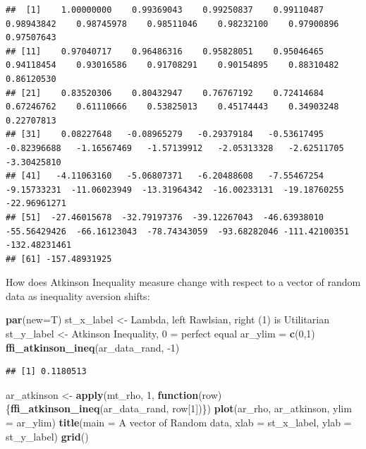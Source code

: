 \documentclass[
]{book}
\newenvironment{Shaded}{\begin{snugshade}}{\end{snugshade}}
\newcommand{\ControlFlowTok}[1]{\textcolor[rgb]{0.13,0.29,0.53}{\textbf{#1}}}
\newcommand{\DataTypeTok}[1]{\textcolor[rgb]{0.13,0.29,0.53}{#1}}
\newcommand{\DecValTok}[1]{\textcolor[rgb]{0.00,0.00,0.81}{#1}}
\newcommand{\KeywordTok}[1]{\textcolor[rgb]{0.13,0.29,0.53}{\textbf{#1}}}
\newcommand{\NormalTok}[1]{#1}
\newcommand{\StringTok}[1]{\textcolor[rgb]{0.31,0.60,0.02}{#1}}
\begin{document}
\begin{verbatim}
##  [1]    1.00000000    0.99369043    0.99250837    0.99110487    0.98943842    0.98745978    0.98511046    0.98232100    0.97900896    0.97507643
## [11]    0.97040717    0.96486316    0.95828051    0.95046465    0.94118454    0.93016586    0.91708291    0.90154895    0.88310482    0.86120530
## [21]    0.83520306    0.80432947    0.76767192    0.72414684    0.67246762    0.61110666    0.53825013    0.45174443    0.34903248    0.22707813
## [31]    0.08227648   -0.08965279   -0.29379184   -0.53617495   -0.82396688   -1.16567469   -1.57139912   -2.05313328   -2.62511705   -3.30425810
## [41]   -4.11063160   -5.06807371   -6.20488608   -7.55467254   -9.15733231  -11.06023949  -13.31964342  -16.00233131  -19.18760255  -22.96961271
## [51]  -27.46015678  -32.79197376  -39.12267043  -46.63938010  -55.56429426  -66.16123043  -78.74343059  -93.68282046 -111.42100351 -132.48231461
## [61] -157.48931925
\end{verbatim}

How does Atkinson Inequality measure change with respect to a vector of random data as inequality aversion shifts:

\begin{Shaded}
\begin{Highlighting}[]
\KeywordTok{par}\NormalTok{(}\DataTypeTok{new=}\NormalTok{T)}
\NormalTok{st\_x\_label \textless{}{-}}\StringTok{ \textquotesingle{}Lambda, left Rawlsian, right (1) is Utilitarian\textquotesingle{}}
\NormalTok{st\_y\_label \textless{}{-}}\StringTok{ \textquotesingle{}Atkinson Inequality, 0 = perfect equal\textquotesingle{}}
\NormalTok{ar\_ylim =}\StringTok{ }\KeywordTok{c}\NormalTok{(}\DecValTok{0}\NormalTok{,}\DecValTok{1}\NormalTok{)}
\KeywordTok{ffi\_atkinson\_ineq}\NormalTok{(ar\_data\_rand, }\DecValTok{{-}1}\NormalTok{)}
\end{Highlighting}
\end{Shaded}

\begin{verbatim}
## [1] 0.1180513
\end{verbatim}

\begin{Shaded}
\begin{Highlighting}[]
\NormalTok{ar\_atkinson \textless{}{-}}\StringTok{ }\KeywordTok{apply}\NormalTok{(mt\_rho, }\DecValTok{1}\NormalTok{, }\ControlFlowTok{function}\NormalTok{(row)\{}\KeywordTok{ffi\_atkinson\_ineq}\NormalTok{(ar\_data\_rand, row[}\DecValTok{1}\NormalTok{])\})}
\KeywordTok{plot}\NormalTok{(ar\_rho, ar\_atkinson, }\DataTypeTok{ylim =}\NormalTok{ ar\_ylim)}
\KeywordTok{title}\NormalTok{(}\DataTypeTok{main =} \StringTok{\textquotesingle{}A vector of Random data\textquotesingle{}}\NormalTok{, }\DataTypeTok{xlab =}\NormalTok{ st\_x\_label, }\DataTypeTok{ylab =}\NormalTok{ st\_y\_label)}
\KeywordTok{grid}\NormalTok{()}
\end{Highlighting}
\end{Shaded}
\end{document}
